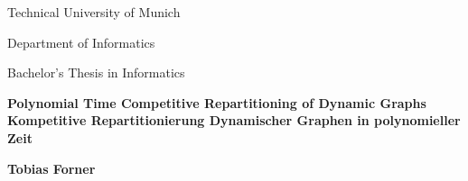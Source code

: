 \documentclass[xcolor=dvipsnames, tikz, 12pt]{article}
\theoremstyle{definition}
\begin{document}
	\begin{titlepage}
		\begin{center}
			\vspace*{1cm}
			
			\large
			Technical University of Munich\\
			\vspace*{1cm}
			
			Department of Informatics\\
			\vspace*{1cm}
			
			Bachelor's Thesis in Informatics\\
			\vspace*{1cm}
			
			\Huge
			\textbf{Polynomial Time Competitive Repartitioning of Dynamic Graphs}\\
			
			\textbf{Kompetitive Repartitionierung Dynamischer Graphen in polynomieller Zeit}
			
			\vspace{2cm}
			
			\Large
			\textbf{Tobias Forner}
			
			\vfill
			
		\end{center}
	\end{titlepage}
\end{document}
